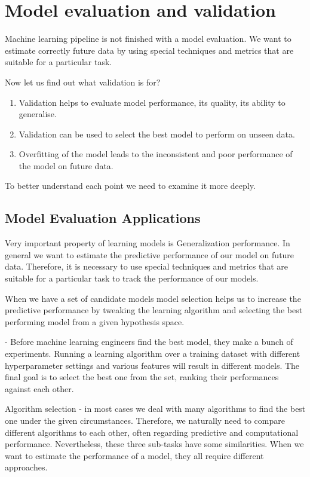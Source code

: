 \section{Model evaluation and validation} \label{sect1_4}
Machine learning pipeline is not finished with a model evaluation. We want to estimate correctly future data by using special techniques and metrics that are suitable for a particular task.

Now let us find out what validation is for?
\begin{enumerate}
	\item Validation helps to evaluate model performance, its quality, its ability to generalise.
	\item Validation can be used to select the best model to perform on unseen data.
	\item Overfitting of the model leads to the inconsistent and poor performance of the model on future data.
\end{enumerate}

To better understand each point we need to examine it more deeply.

\subsection{Model Evaluation Applications}
Very important property of learning models is Generalization performance. In general we want to estimate the predictive performance of our model on future data.  Therefore, it is necessary to use special techniques and metrics that are suitable for a particular task to track the performance of our models. 

When we have a set of candidate models model selection helps us to increase the predictive performance by tweaking the learning algorithm and selecting the best performing model from a given hypothesis space.
 
- Before machine learning engineers find the best model, they make a bunch of experiments. Running a learning algorithm over a training dataset with different hyperparameter settings and various features will result in different models. The final goal is to select the best one from the set, ranking their performances against each other.

Algorithm selection - in most cases we deal with many algorithms to find the best one under the given circumstances. Therefore, we naturally need to compare different algorithms to each other, often regarding predictive and computational performance.
Nevertheless, these three sub-tasks have some similarities. When we want to estimate the performance of a model, they all require different approaches.


